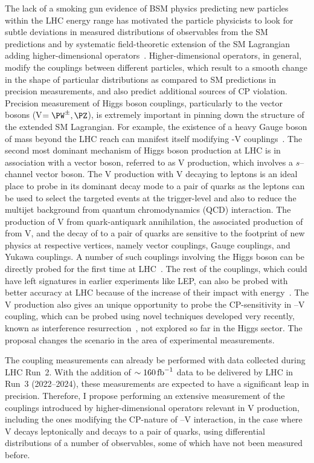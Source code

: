 \documentclass[a4paper,11pt]{article}
\newcommand{\Pb}{{{\Pqb}}\xspace}
\newcommand{\PAb}{{{{\Paqb}}}\xspace}
\renewcommand{\PV}{{{{V}}}\xspace}
\newcommand{\VH}{{{\PV}{\PH}}\xspace}
\begin{document}
The lack of a smoking gun evidence of BSM physics predicting new particles within the LHC energy range has motivated the particle physicists to look for subtle deviations in measured distributions of observables from the SM predictions and by systematic field-theoretic extension of the SM Lagrangian adding higher-dimensional operators~\cite{Grinstein:1991cd,Chiu:2007dg,Passarino:2016pzb}.
Higher-dimensional operators, in general, modify the couplings between different particles, which result to a smooth change in the shape of particular distributions as compared to SM predictions in precision measurements, and 
also predict additional sources of CP violation. 
Precision measurement of Higgs boson couplings, particularly to the vector bosons (\PV$=\PW^{\pm},\PZ$), is extremely important in pinning down the structure of the extended SM Lagrangian. 
For example, the existence of a heavy Gauge boson of mass beyond the LHC reach can manifest itself modifying {\PH}-{\PV} couplings~\cite{Appelquist:1974tg}. 
The second most dominant mechanism of Higgs boson production at LHC is in association with a vector boson, referred to as \VH production, which involves a $s$--channel vector boson. 
The \VH production with \PV decaying to leptons is an ideal place to probe \PH in its dominant decay mode to a pair of \Pb quarks as the leptons can be used to select the targeted events at the trigger-level and also to reduce the multijet background from quantum chromodynamics (QCD) interaction.
The production of \PV from quark-antiquark annihilation, the associated production of \PH from \PV, and the decay of \PH to a pair of \Pb quarks are sensitive to the footprint of new physics at respective vertices, namely vector couplings, Gauge couplings, and Yukawa couplings. %
A number of such couplings involving the Higgs boson can be directly probed for the first time at LHC~\cite{Gupta:2014rxa}.
The rest of the couplings, which could have left signatures in earlier experiments like LEP, can also be probed with better accuracy at LHC because of the increase of their impact with energy~\cite{Ellis:2014jta,Grojean:2018dqj}.
The \VH production also gives an unique opportunity to probe the CP-sensitivity in \PH--\PV coupling, 
which can be probed using novel techniques developed very recently, known as interference resurrection~\cite{Panico:2017frx}, 
not explored so far in the Higgs sector. 
The proposal changes the scenario in the area of experimental measurements.  


The coupling measurements can already be performed with data collected during LHC Run~2. 
With the addition of $\sim 160\mbox{\ensuremath{\,\text{fb}^{-1}}}$ data to be delivered by LHC in Run~3 (2022--2024), these measurements are expected to have a significant leap in precision.
Therefore, I propose performing an extensive measurement of the couplings introduced by higher-dimensional operators relevant in \VH production, 
including the ones modifying the CP-nature of \PH--\PV interaction,
in the case where \PV decays leptonically and \PH decays to a pair of \Pb quarks, 
using differential distributions of a number of observables, some of which have not been measured before.
\end{document}
